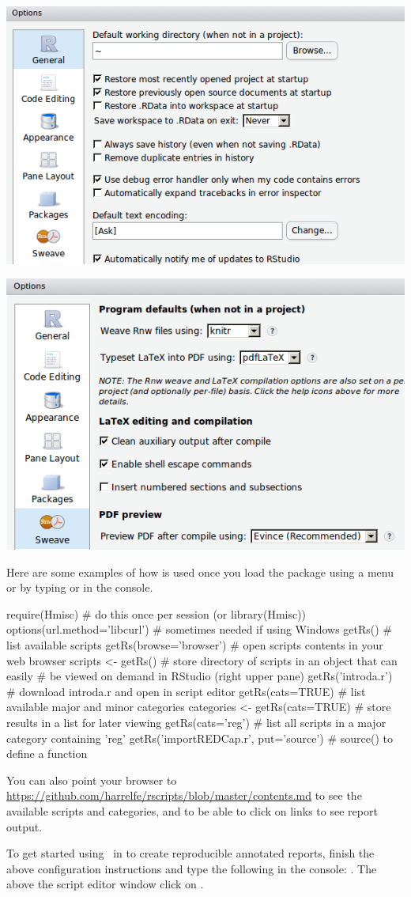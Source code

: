 \centerline{\includegraphics[width=.5\textwidth]{rstudioOptions.png}}

\bigskip

\centerline{\includegraphics[width=.5\textwidth]{rstudioSweave.png}}
\ee
Here are some examples of how  is used once you
load the  package using a menu or by typing
 or  in the console.
\begin{Schunk}
\begin{Sinput}
require(Hmisc)      # do this once per session (or library(Hmisc))
options(url.method='libcurl')    # sometimes needed if using Windows
getRs()             # list available scripts
getRs(browse='browser')  # open scripts contents in your web browser
scripts <- getRs()  # store directory of scripts in an object that can easily
                    # be viewed on demand in RStudio (right upper pane)
getRs('introda.r')  # download introda.r and open in script editor
getRs(cats=TRUE)    # list available major and minor categories
categories <- getRs(cats=TRUE)  # store results in a list for later viewing
getRs(cats='reg')   # list all scripts in a major category containing 'reg'
getRs('importREDCap.r', put='source')   # source() to define a function
\end{Sinput}
\end{Schunk}
You can also point your browser to
\url{https://github.com/harrelfe/rscripts/blob/master/contents.md} to
see the available scripts and categories, and to be able to click on
links to see  report output.

To get started using \R\ in  to create reproducible
annotated reports, finish the above configuration instructions and
type the following in the  console:
.  The above the script editor window
click on .

